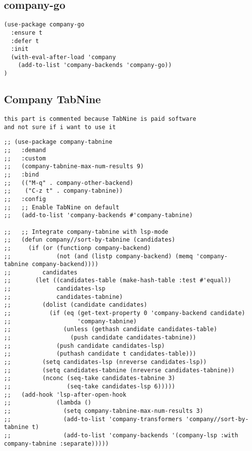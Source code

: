 \documentclass[11pt]{article}
\begin{document}
\subsection*{company-go}
\label{sec:org4a609c9}
\begin{verbatim}
(use-package company-go
  :ensure t
  :defer t
  :init
  (with-eval-after-load 'company
    (add-to-list 'company-backends 'company-go))
)
\end{verbatim}

\subsection*{Company TabNine}
\label{sec:orgd966fe9}
\begin{verbatim}
this part is commented because TabNine is paid software
and not sure if i want to use it
\end{verbatim}

\begin{verbatim}
;; (use-package company-tabnine
;;   :demand
;;   :custom
;;   (company-tabnine-max-num-results 9)
;;   :bind
;;   (("M-q" . company-other-backend)
;;    ("C-z t" . company-tabnine))
;;   :config
;;   ;; Enable TabNine on default
;;   (add-to-list 'company-backends #'company-tabnine)

;;   ;; Integrate company-tabnine with lsp-mode
;;   (defun company//sort-by-tabnine (candidates)
;;     (if (or (functionp company-backend)
;;             (not (and (listp company-backend) (memq 'company-tabnine company-backend))))
;;         candidates
;;       (let ((candidates-table (make-hash-table :test #'equal))
;;             candidates-lsp
;;             candidates-tabnine)
;;         (dolist (candidate candidates)
;;           (if (eq (get-text-property 0 'company-backend candidate)
;;                   'company-tabnine)
;;               (unless (gethash candidate candidates-table)
;;                 (push candidate candidates-tabnine))
;;             (push candidate candidates-lsp)
;;             (puthash candidate t candidates-table)))
;;         (setq candidates-lsp (nreverse candidates-lsp))
;;         (setq candidates-tabnine (nreverse candidates-tabnine))
;;         (nconc (seq-take candidates-tabnine 3)
;;                (seq-take candidates-lsp 6)))))
;;   (add-hook 'lsp-after-open-hook
;;             (lambda ()
;;               (setq company-tabnine-max-num-results 3)
;;               (add-to-list 'company-transformers 'company//sort-by-tabnine t)
;;               (add-to-list 'company-backends '(company-lsp :with company-tabnine :separate)))))
\end{verbatim}
\end{document}
